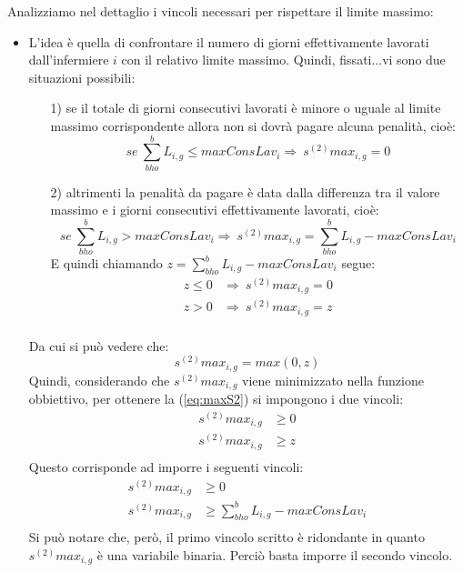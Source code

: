 Analizziamo nel dettaglio i vincoli necessari per rispettare il limite massimo:
\begin{itemize}

\item L'idea è quella di confrontare il numero di giorni effettivamente lavorati dall'infermiere $i$ con il relativo limite massimo. Quindi, fissati...vi sono due situazioni possibili:
\begin{itemize}
\item [1)] se il totale di giorni consecutivi lavorati è minore o uguale al limite massimo corrispondente allora non si dovrà pagare alcuna penalità, cioè:
\begin{equation}
se ~ \sum_{bho}^b L_{i, g} \leq maxConsLav_i \Longrightarrow\ s^{(2)}max_{i, g} = 0
\end{equation}
\item [2)] altrimenti la penalità da pagare è data dalla differenza tra il valore massimo e i giorni consecutivi effettivamente lavorati, cioè:
\begin{equation}
se ~ \sum_{bho}^b L_{i, g} > maxConsLav_i \Longrightarrow\ s^{(2)}max_{i, g} = \sum_{bho}^b L_{i, g} - maxConsLav_i
\end{equation}
E quindi chiamando $ z = \sum_{bho}^b L_{i, g} - maxConsLav_i$ segue:
\begin{equation}
\begin{split}
z \leq 0 &\Longrightarrow\ s^{(2)}max_{i, g} = 0 \\
z > 0 &\Longrightarrow\ s^{(2)}max_{i, g} = z \\
\end{split}
\end{equation}
\end{itemize}
Da cui si può vedere che:
\begin{equation}
\label{eq:maxS2}
s^{(2)}max_{i, g} = max(0, z)
\end{equation}
Quindi, considerando che $s^{(2)}max_{i, g}$ viene minimizzato nella funzione obbiettivo, per ottenere la (\ref{eq:maxS2}) si impongono i due vincoli:
\begin{equation}
\begin{split}
s^{(2)}max_{i, g} &\geq 0 \\
s^{(2)}max_{i, g} &\geq z \\
\end{split}
\end{equation}
Questo corrisponde ad imporre i seguenti vincoli:
\begin{equation}
\begin{split}
s^{(2)}max_{i, g} &\geq 0\\
s^{(2)}max_{i, g} &\geq \sum_{bho}^b L_{i, g} - maxConsLav_i\\
\end{split}
\end{equation}
Si può notare che, però, il primo vincolo scritto è ridondante in quanto $s^{(2)}max_{i, g}$ è una variabile binaria. Perciò basta imporre il secondo vincolo.


\end{itemize}
